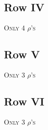 \documentclass[9pt]{article}
\numberwithin{equation}{section}
\begin{document}
\subsection{Row IV}
\textsc{Only 4 $\rho$'s}
\subsection{Row V}
\textsc{Only 3 $\rho$'s}
\subsection{Row VI}
\textsc{Only 3 $\rho$'s}
\end{document}
